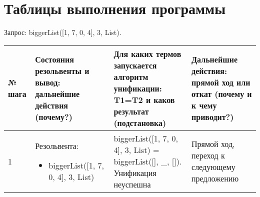 \documentclass[14pt,a4paper]{scrreprt}
\begin{document}
\section{Таблицы выполнения программы}

Запрос: biggerList([1, 7, 0, 4], 3, List).
\begin{table}[H]
	\begin{tabular}{|p{0.8cm\small}|p{4.7cm\small}|p{5.7cm\small}|p{4cm\small}|}	
		\hline
		№ шага & Состояния резольвенты и вывод: дальнейшие действия (почему?) & Для каких термов запускается алгоритм унификации: T1=T2 и каков результат (подстановка) & Дальнейшие действия: прямой ход или откат (почему и к чему приводит?)\\
		\hline
		1 & Резольвента: \begin{itemize}
			\item biggerList([1, 7, 0, 4], 3, List)
		\end{itemize} & biggerList([1, 7, 0, 4], 3, List) = biggerList([], \_, []). Унификация неуспешна & Прямой ход, переход к следующему предложению\\
		\hline
	\end{tabular}
\end{table}
\end{document}
